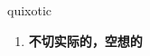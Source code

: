 
\begin{frame}
{\huge quixotic}
\begin{center}
\begin{enumerate}\Large
  \item \textbf{不切实际的，空想的}
\end{enumerate}
\end{center}
\end{frame}
